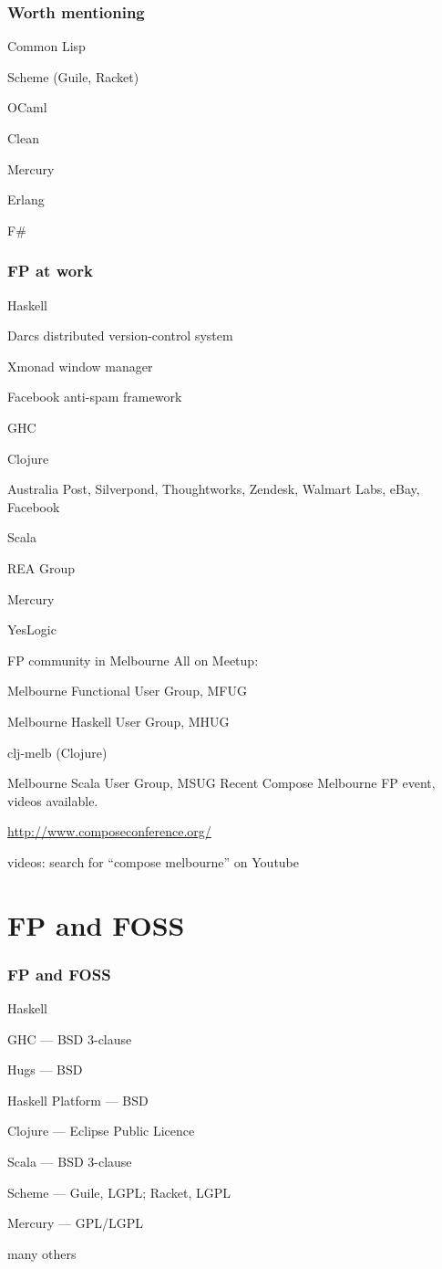 \begin{frame}
\frametitle{Worth mentioning}
\bi
\item Common Lisp
\item Scheme (Guile, Racket)
\item OCaml
\item Clean
\item Mercury
\item Erlang
\item F\#
\ei
\end{frame}

\begin{frame}
\frametitle{FP at work}
\bi
\item Haskell
\bi
\item Darcs distributed version-control system
\item Xmonad window manager
\item Facebook anti-spam framework
\item GHC
\ei
\item Clojure
\bi
\item Australia Post, Silverpond, Thoughtworks, Zendesk, Walmart
      Labs, eBay, Facebook
\ei
\item Scala
\bi
\item REA Group
\ei
\item Mercury
\bi
\item YesLogic
\ei
\ei
\end{frame}

\begin{frame}{FP community in Melbourne}
All on Meetup:
\bi
\item Melbourne Functional User Group, MFUG
\item Melbourne Haskell User Group, MHUG
\item clj-melb (Clojure)
\item Melbourne Scala User Group, MSUG
\ei
Recent Compose Melbourne FP event, videos available.
\bi
\item \url{http://www.composeconference.org/}
\item videos: search for ``compose melbourne'' on Youtube
\ei
\end{frame}

\section{FP and FOSS}

\begin{frame}
\frametitle{FP and FOSS}
\bi
\item Haskell
\bi
\item GHC --- BSD 3-clause
\item Hugs --- BSD
\item Haskell Platform --- BSD
\ei
\item Clojure --- Eclipse Public Licence
\item Scala --- BSD 3-clause
\item Scheme --- Guile, LGPL; Racket, LGPL
\item Mercury --- GPL{\slash}LGPL
\item many others
\ei
\end{frame}

